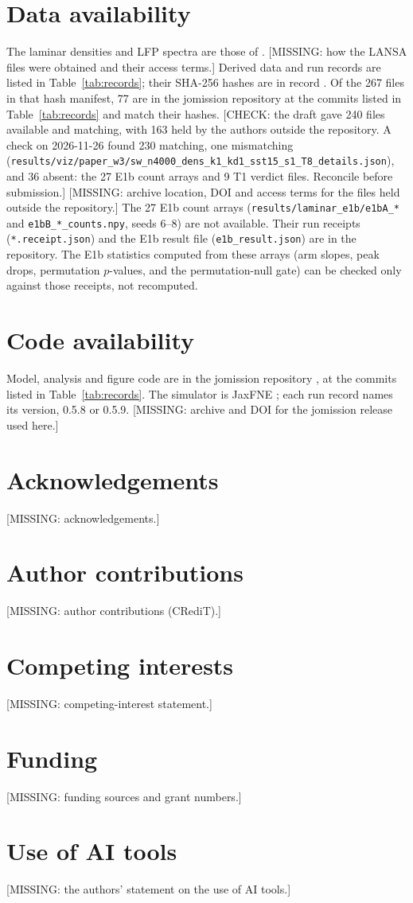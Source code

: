 \section*{Data availability}
The laminar densities and LFP spectra are those of \citet{Mulvey2024}. [MISSING: how the LANSA files were obtained and their access terms.] Derived data and run records are listed in Table~\ref{tab:records}; their SHA-256 hashes are in record . Of the 267 files in that hash manifest, 77 are in the jomission repository at the commits listed in Table~\ref{tab:records} and match their hashes. [CHECK: the draft gave 240 files available and matching, with 163 held by the authors outside the repository. A check on 2026-11-26 found 230 matching, one mismatching (\texttt{results/viz/paper\_w3/sw\_n4000\_dens\_k1\_kd1\_sst15\_s1\_T8\_details.json}), and 36 absent: the 27 E1b count arrays and 9 T1 verdict files. Reconcile before submission.] [MISSING: archive location, DOI and access terms for the files held outside the repository.] The 27 E1b count arrays (\texttt{results/laminar\_e1b/e1bA\_*} and \texttt{e1bB\_*\_counts.npy}, seeds 6--8) are not available. Their run receipts (\texttt{*.receipt.json}) and the E1b result file (\texttt{e1b\_result.json}) are in the repository. The E1b statistics computed from these arrays (arm slopes, peak drops, permutation $p$-values, and the permutation-null gate) can be checked only against those receipts, not recomputed.

\section*{Code availability}
Model, analysis and figure code are in the jomission repository \citep{Jomission}, at the commits listed in Table~\ref{tab:records}. The simulator is JaxFNE \citep{JaxFNE}; each run record names its version, 0.5.8 or 0.5.9. [MISSING: archive and DOI for the jomission release used here.]

\section*{Acknowledgements}
[MISSING: acknowledgements.]

\section*{Author contributions}
[MISSING: author contributions (CRediT).]

\section*{Competing interests}
[MISSING: competing-interest statement.]

\section*{Funding}
[MISSING: funding sources and grant numbers.]

\section*{Use of AI tools}
[MISSING: the authors' statement on the use of AI tools.]
